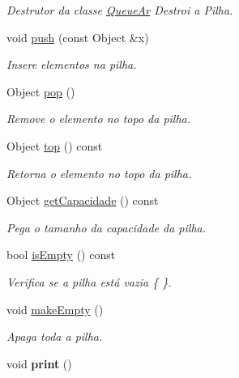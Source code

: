 \begin{DoxyCompactItemize}
\begin{DoxyCompactList}\small\item\em Destrutor da classe \hyperlink{class_queue_ar}{Queue\+Ar} Destroi a Pilha. \end{DoxyCompactList}\item 
void \hyperlink{class_stack_ar_ad3fc10de870f4ef52fb37f0a9b335222}{push} (const Object \&x)
\begin{DoxyCompactList}\small\item\em Insere elementos na pilha. \end{DoxyCompactList}\item 
Object \hyperlink{class_stack_ar_a53d0e26536ad28e464b8bf99f84d8760}{pop} ()
\begin{DoxyCompactList}\small\item\em Remove o elemento no topo da pilha. \end{DoxyCompactList}\item 
Object \hyperlink{class_stack_ar_a15a4938f80dc4009aaba5eb01bd1e6c1}{top} () const 
\begin{DoxyCompactList}\small\item\em Retorna o elemento no topo da pilha. \end{DoxyCompactList}\item 
Object \hyperlink{class_stack_ar_a6f12b2c8213a6935cfb7ecf7d4875210}{get\+Capacidade} () const 
\begin{DoxyCompactList}\small\item\em Pega o tamanho da capacidade da pilha. \end{DoxyCompactList}\item 
bool \hyperlink{class_stack_ar_ae4dcecdf54a3f6ed7cf9192cec8c60a5}{is\+Empty} () const 
\begin{DoxyCompactList}\small\item\em Verifica se a pilha está vazia \{ \}. \end{DoxyCompactList}\item 
void \hyperlink{class_stack_ar_ac6252abb241ee6d9c827eabd4519fdb8}{make\+Empty} ()
\begin{DoxyCompactList}\small\item\em Apaga toda a pilha. \end{DoxyCompactList}\item 
void {\bfseries print} ()\hypertarget{class_stack_ar_a1e3e5bd273aa6034dd0f95d6a00f6220}{}\label{class_stack_ar_a1e3e5bd273aa6034dd0f95d6a00f6220}

\end{DoxyCompactItemize}
